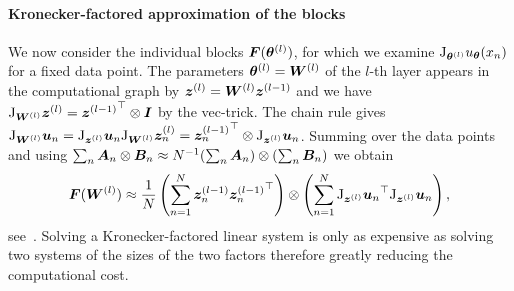 \begin{comment}
    Consider the Jacobian $\jac_{\va}\vb$ of a vector $\vb$ with respect to a vector $\va$, which collects all partial derivatives as $[\mJ_{\va}\vb]_{i,j} = \nicefrac{\partial [\vb]_i}{\partial [\va]_j}$. 
For the Jacobian $\jac_{\mA}\mB$ of a matrix $\mB$ with respect to a matrix $\mA$, we simply set $\jac_{\mA} \mB = \jac_{\flatten( \mA )}\flatten(\mB)$.
Likewise, the Hessian $\gradsquared{\va}b$ of a scalar $b$ with respect to a vector $\va$ collects the second-order partial derivatives according to $[\gradsquared{\va}b]_{i,j} = \nicefrac{\partial^2 b}{\partial [\va]_i \partial [\va]_j}$.
For the Hessian $\gradsquared{\mA} b$ of a scalar $b$  with respect to \,a matrix $\mA$, we simply have $\gradsquared{\mA} b = \gradsquared{\flatten(\mA)}b$.
We also have $\grad{\mA} b = \grad{\flatten(\mA)} b$ for the gradient of a scalar w.r.t.\,a matrix.
\end{comment}

\paragraph{Kronecker-factored approximation of the blocks}
We now consider the individual blocks ${\bm{F}}({\bm{\theta}}^{(l)})$, for which we examine $\mathrm{J}_{{\bm{\theta}}^{(l)}} u_{{\bm{\theta}}}(x_n)$ for a fixed data point. 
The parameters ${\bm{\theta}}^{(l)} = {\bm{W}}^{(l)}$ of the $l$-th layer appears in the computational graph by ${\bm{z}}^{(l)} = {\bm{W}}^{(l)}{\bm{z}}^{(l-1)}$ and %
we have $\mathrm{J}_{{\bm{W}}^{(l)}} {\bm{z}}^{(l)} = {{\bm{z}}^{(l-1)}}^\top \otimes {\bm{I}}$ by the vec-trick. 
The chain rule gives  
    $\jac_{\mW^{(l)}} \vu_n%
     = \jac_{\vz^{(l)}}  \vu_n \jac_{\mW^{(l)}} \vz_n^{(l)}%
    = {\vz^{(l-1)}_n}^\top\otimes  \jac_{\vz^{(l)}}  \vu_n$. %
Summing over the data points and using  $\sum_n {\bm{A}}_n \otimes {\bm{B}}_n \approx N^{-1}(\sum_n {\bm{A}}_n) \otimes (\sum_n {\bm{B}}_n)$ %
 we obtain 
\begin{equation}
    \mF(\mW^{(l)}) %
    \approx \frac1N\left(\sum_{n=1}^N \vz^{(l-1)}_n {\vz^{(l-1)}_n}^\top \right)\otimes \left(\sum_{n=1}^N
    {\jac_{\vz^{(l)}}  \vu_n}^\top
    \jac_{\vz^{(l)}}  \vu_n
    \right),
\end{equation}
see~\citep{eschenhagen2023kroneckerfactored}. 
Solving a Kronecker-factored linear system is only as expensive as solving two systems of the sizes of the two factors therefore greatly reducing the computational cost. 


